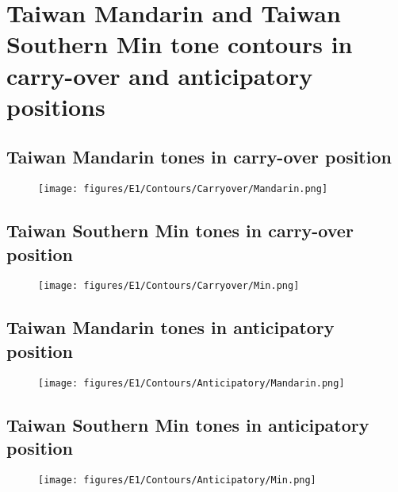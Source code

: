 

\section{Taiwan Mandarin and Taiwan Southern Min tone contours in carry-over and anticipatory positions}\label{Appendix:ToneContours}

\pagebreak
\subsection{Taiwan Mandarin tones in carry-over position}
\begin{figure}[hbt!]
\centering
\texttt{[image: figures/E1/Contours/Carryover/Mandarin.png]}
\end{figure}

\pagebreak
\subsection{Taiwan Southern Min tones in carry-over position}
\begin{figure}[hbt!]
\centering
\texttt{[image: figures/E1/Contours/Carryover/Min.png]}
\end{figure}

\pagebreak
\subsection{Taiwan Mandarin tones in anticipatory position}
\begin{figure}[hbt!]
\centering
\texttt{[image: figures/E1/Contours/Anticipatory/Mandarin.png]}
\end{figure}

\pagebreak
\subsection{Taiwan Southern Min tones in anticipatory position}
\begin{figure}[hbt!]
\centering
\texttt{[image: figures/E1/Contours/Anticipatory/Min.png]}
\end{figure}